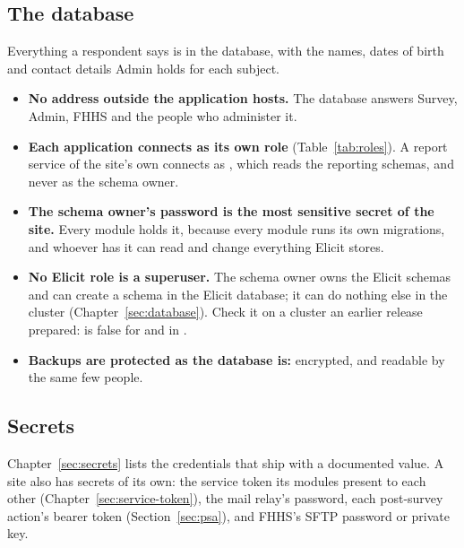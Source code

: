 \documentclass[11pt, a4paper]{article}
\begin{document}
\subsection{The database}
\label{sec:security-database}

Everything a respondent says is in the database, with the names, dates of birth and contact
details Admin holds for each subject.

\begin{itemize}
  \item \textbf{No address outside the application hosts.} The database answers Survey, Admin,
        FHHS and the people who administer it.
  \item \textbf{Each application connects as its own role} (Table~\ref{tab:roles}). A report
        service of the site's own connects as , which reads the reporting
        schemas, and never as the schema owner.
  \item \textbf{The schema owner's password is the most sensitive secret of the site.} Every
        module holds it, because every module runs its own migrations, and whoever has it can
        read and change everything Elicit stores.
  \item \textbf{No Elicit role is a superuser.} The schema owner owns the Elicit schemas and
        can create a schema in the Elicit database; it can do nothing else in the cluster
        (Chapter~\ref{sec:database}). Check it on a cluster an earlier release prepared:
         is false for  and  in .
  \item \textbf{Backups are protected as the database is:} encrypted, and readable by the same
        few people.
\end{itemize}

\subsection{Secrets}
\label{sec:security-secrets}

Chapter~\ref{sec:secrets} lists the credentials that ship with a documented value. A site also
has secrets of its own: the service token its modules present to each other
(Chapter~\ref{sec:service-token}), the mail relay's password, each post-survey action's bearer
token
(Section~\ref{sec:psa}), and FHHS's SFTP password or private key.
\end{document}
